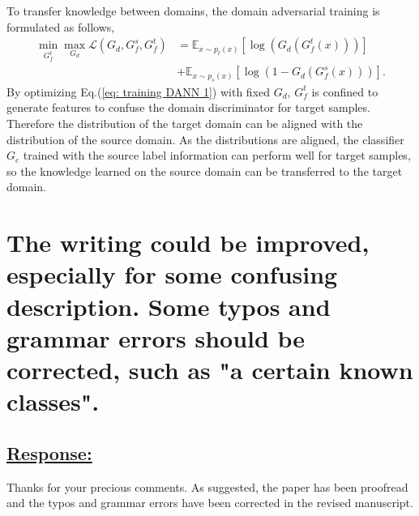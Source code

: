 To transfer knowledge between domains, the domain adversarial training is formulated as follows,
\begin{equation}
    \label{eq: training DANN 1}
    \begin{split}
        \min_{G_f^t} \max_{G_d} \mathscr{L}(G_d,G^{s}_{f},G_f^t) &=\mathbb{E}_{x\sim p_t(x)} \left[ \log \left(G_d\left(G_f^t\left(x\right)\right)\right) \right]\\
        &+\mathbb{E}_{x\sim p_s(x)}\left[ \log \left(1-G_d\left(G_f^s\left(x\right)\right)\right) \right].
    \end{split}
\end{equation}
By optimizing Eq.(\ref{eq: training DANN 1}) with fixed $G_d$, $G_f^t$ is confined to generate features to confuse the domain discriminator for target samples.
Therefore the distribution of the target domain can be aligned with the distribution of the source domain.
As the distributions are aligned, the classifier $G_c$ trained with the source label information can perform well for target samples, so the knowledge learned on the source domain can be transferred to the target domain.


\section{The writing could be improved, especially for some confusing description.
Some typos and grammar errors should be corrected, such as "a certain known classes".}

\subsection*{\underline{\textbf{Response:}}}

Thanks for your precious comments.
As suggested, the paper has been proofread and the typos and grammar errors have been corrected in the revised manuscript.
